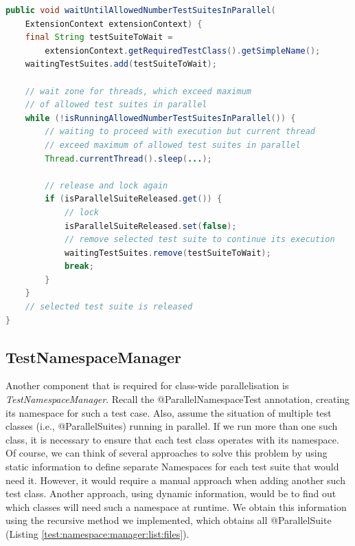 \begin{lstlisting}[language=Java,label=parallel:suite:sync,caption=Additional synchronization for multiple @ParallelSuite\, that exceed our configured parallelism limit and are spawned by ForkJoinPool,frame=tb]
public void waitUntilAllowedNumberTestSuitesInParallel(
    ExtensionContext extensionContext) {
    final String testSuiteToWait =
        extensionContext.getRequiredTestClass().getSimpleName();
    waitingTestSuites.add(testSuiteToWait);

    // wait zone for threads, which exceed maximum
    // of allowed test suites in parallel
    while (!isRunningAllowedNumberTestSuitesInParallel()) {
        // waiting to proceed with execution but current thread
        // exceed maximum of allowed test suites in parallel
        Thread.currentThread().sleep(...);

        // release and lock again
        if (isParallelSuiteReleased.get()) {
            // lock
            isParallelSuiteReleased.set(false);
            // remove selected test suite to continue its execution
            waitingTestSuites.remove(testSuiteToWait);
            break;
        }
    }
    // selected test suite is released
}
\end{lstlisting}

\subsection{TestNamespaceManager}
\label{05:class:wide:test:namespace:manager}

Another component that is required for class-wide parallelisation is \emph{TestNamespaceManager}.
Recall the @ParallelNamespaceTest annotation, creating its namespace for such a test case.
Also, assume the situation of multiple test classes (i.e., @ParallelSuites) running in parallel.
If we run more than one such class, it is necessary to ensure that each test class operates with its namespace.
Of course, we can think of several approaches to solve this problem by using static information to define separate Namespaces
for each test suite that would need it. However, it would require a manual approach when adding another such test class.
Another approach, using dynamic information, would be to find out which classes will need such a namespace at runtime.
We obtain this information using the recursive method we implemented, which obtains all @ParallelSuite (Listing \ref{test:namespace:manager:list:files}).

